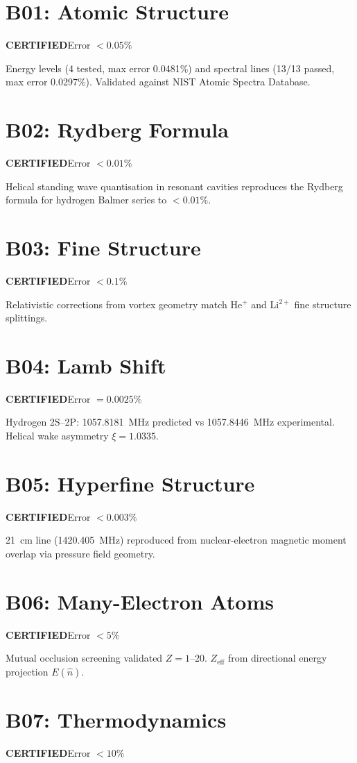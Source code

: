 \documentclass[12pt,a4paper]{report}
\newcommand{\PASS}{\textcolor{pass}{\textbf{CERTIFIED}}}
\begin{document}
\section{B01: Atomic Structure}
\PASS\quad Error $<0.05\%$

Energy levels (4 tested, max error 0.0481\%) and spectral lines (13/13 passed, max error 0.0297\%). Validated against NIST Atomic Spectra Database.

\section{B02: Rydberg Formula}
\PASS\quad Error $<0.01\%$

Helical standing wave quantisation in resonant cavities reproduces the Rydberg formula for hydrogen Balmer series to $<0.01\%$.

\section{B03: Fine Structure}
\PASS\quad Error $<0.1\%$

Relativistic corrections from vortex geometry match He$^+$ and Li$^{2+}$ fine structure splittings.

\section{B04: Lamb Shift}
\PASS\quad Error $= 0.0025\%$

Hydrogen 2S--2P: 1057.8181~MHz predicted vs 1057.8446~MHz experimental. Helical wake asymmetry $\xi = 1.0335$.

\section{B05: Hyperfine Structure}
\PASS\quad Error $<0.003\%$

21~cm line (1420.405~MHz) reproduced from nuclear-electron magnetic moment overlap via pressure field geometry.

\section{B06: Many-Electron Atoms}
\PASS\quad Error $<5\%$

Mutual occlusion screening validated $Z = 1$--20. $Z_{\text{eff}}$ from directional energy projection $E(\hat{n})$.

\section{B07: Thermodynamics}
\PASS\quad Error $<10\%$
\end{document}
